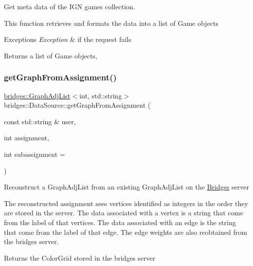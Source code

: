 Get meta data of the I\+GN games collection.

This function retrieves and formats the data into a list of Game objects


\begin{DoxyExceptions}{Exceptions}
{\em Exception} & if the request fails\\
\hline
\end{DoxyExceptions}
\begin{DoxyReturn}{Returns}
a list of Game objects, 
\end{DoxyReturn}
\mbox{\label{classbridges_1_1_data_source_ac4edf55c163c60f17b13f5499e5d2e65}} 
\subsubsection{\texorpdfstring{get\+Graph\+From\+Assignment()}{getGraphFromAssignment()}}
{\footnotesize\ttfamily \hyperlink{classbridges_1_1datastructure_1_1_graph_adj_list}{bridges\+::\+Graph\+Adj\+List}$<$int, std\+::string$>$ bridges\+::\+Data\+Source\+::get\+Graph\+From\+Assignment (\begin{DoxyParamCaption}\item[{const std\+::string \&}]{user,  }\item[{int}]{assignment,  }\item[{int}]{subassignment = {} }\end{DoxyParamCaption})\hspace{0.3cm}{\ttfamily [inline]}}

Reconstruct a Graph\+Adj\+List from an existing Graph\+Adj\+List on the \hyperlink{classbridges_1_1_bridges}{Bridges} server

The reconstructed assignment sees vertices identified as integers in the order they are stored in the server. The data associated with a vertex is a string that come from the label of that vertices. The data associated with an edge is the string that come from the label of that edge. The edge weights are also reobtained from the bridges server.

\begin{DoxyReturn}{Returns}
the Color\+Grid stored in the bridges server 
\end{DoxyReturn}

